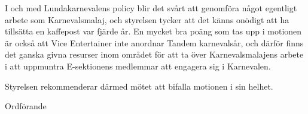 \documentclass[../_main/handlingar.tex]{subfiles}
\begin{document}
\motionssvar

I och med Lundakarnevalens policy blir det svårt att genomföra något egentligt arbete som Karnevalsmalaj, och styrelsen tycker att det känns onödigt att ha tillsätta en kaffepost var fjärde år.
En mycket bra poäng som tas upp i motionen är också att Vice Entertainer inte anordnar Tandem karnevalsår, och därför finns det ganska givna resurser inom området för att ta över Karnevalsmalajens arbete i att uppmuntra E-sektionens medlemmar att engagera sig i Karnevalen. 

Styrelsen rekommenderar därmed mötet att bifalla motionen i sin helhet. 

\begin{signatures}{1}
    \ist
    \signature{\ordf}{Ordförande}
\end{signatures}
\end{document}
